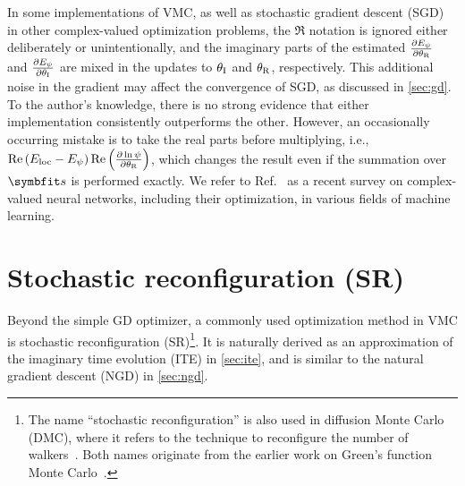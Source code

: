 In some implementations of VMC, as well as stochastic gradient descent (SGD) in other complex-valued optimization problems, the $\Re$ notation is ignored either deliberately or unintentionally, and the imaginary parts of the estimated $\frac{\partial E_\psi}{\partial {\theta_\text{R}}}$ and $\frac{\partial E_\psi}{\partial {\theta_\text{I}}}$ are mixed in the updates to ${\theta_\text{I}}$ and ${\theta_\text{R}}$, respectively. This additional noise in the gradient may affect the convergence of SGD, as discussed in \cref{sec:gd}. To the author's knowledge, there is no strong evidence that either implementation consistently outperforms the other. However, an occasionally occurring mistake is to take the real parts before multiplying, i.e., $\Re\left( E_\text{loc} - E_\psi \right) \Re\left( \frac{\partial \ln \psi}{\partial {\theta_\text{R}}} \right)$, which changes the result even if the summation over $\vs$ is performed exactly. We refer to Ref.~\cite{bassey2021survey} as a recent survey on complex-valued neural networks, including their optimization, in various fields of machine learning.

\section{Stochastic reconfiguration (SR)}
\label{sec:sr}

Beyond the simple GD optimizer, a commonly used optimization method in VMC is stochastic reconfiguration (SR)\footnote{The name ``stochastic reconfiguration'' is also used in diffusion Monte Carlo (DMC), where it refers to the technique to reconfigure the number of walkers~\cite{assaraf2000diffusion}. Both names originate from the earlier work on Green's function Monte Carlo~\cite{sorella1998green}.}. It is naturally derived as an approximation of the imaginary time evolution (ITE) in \cref{sec:ite}, and is similar to the natural gradient descent (NGD) in \cref{sec:ngd}.

